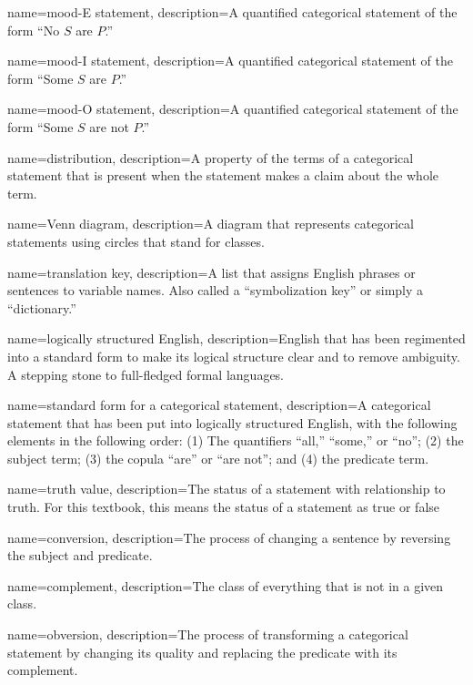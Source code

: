 {
name=mood-E statement,
description={A quantified categorical statement of the form ``No $S$ are $P$.''}
}

{
name=mood-I statement,
description={A quantified categorical statement of the form ``Some $S$ are $P$.''}
}

{
name=mood-O statement,
description={A quantified categorical statement of the form ``Some $S$ are not $P$.''}
}

{
name=distribution,
description={A property of the terms of a categorical statement that is present when the statement makes a claim about the whole term.}
}

{
name=Venn diagram,
description={A diagram that represents categorical statements using circles that stand for classes.}
}

{
name=translation key,
description={A list that assigns English phrases or sentences to variable names. Also called a ``symbolization key''  or simply a ``dictionary.''}
}

{
name=logically structured English,
description={English that has been regimented into a standard form to make its logical structure clear and to remove ambiguity. A stepping stone to full-fledged formal languages.}
}

{
name=standard form for a categorical statement,
description={A categorical statement that has been put into logically structured English, with the following elements in the following order: (1) The quantifiers ``all,'' ``some,'' or ``no''; (2) the subject term; (3) the copula ``are'' or ``are not''; and (4) the predicate term.}
}

{
  name=truth value,
  description={The status of a statement with relationship to truth. For  this textbook, this means the status of a statement as true or false}
}

{
name=conversion,
description={The process of changing a sentence by reversing the subject and predicate.}
}

{
name=complement,
description={The class of everything that is not in a given class.}
}

{
name=obversion,
description={The process of transforming a categorical statement by changing its quality and replacing the predicate with its complement.}
}

